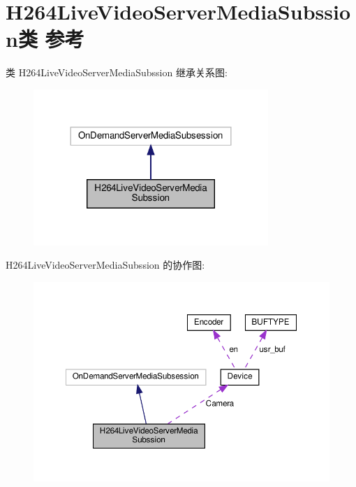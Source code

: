 \hypertarget{class_h264_live_video_server_media_subssion}{}\section{H264\+Live\+Video\+Server\+Media\+Subssion类 参考}
\label{class_h264_live_video_server_media_subssion}


类 H264\+Live\+Video\+Server\+Media\+Subssion 继承关系图\+:
\nopagebreak
\begin{figure}[H]
\begin{center}
\leavevmode
\includegraphics[width=252pt]{class_h264_live_video_server_media_subssion__inherit__graph}
\end{center}
\end{figure}


H264\+Live\+Video\+Server\+Media\+Subssion 的协作图\+:
\nopagebreak
\begin{figure}[H]
\begin{center}
\leavevmode
\includegraphics[width=350pt]{class_h264_live_video_server_media_subssion__coll__graph}
\end{center}
\end{figure}
